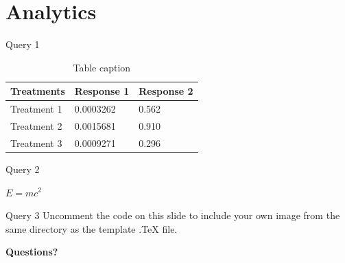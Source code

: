 \documentclass[aspectratio=169,xcolor=dvipsnames]{beamer}
\begin{document}
\section{Analytics}

\begin{frame}{Query 1}
	\begin{table}
		\begin{tabular}{l l l}
			\toprule
			\textbf{Treatments} & \textbf{Response 1} & \textbf{Response 2} \\
			\midrule
			Treatment 1         & 0.0003262           & 0.562               \\
			Treatment 2         & 0.0015681           & 0.910               \\
			Treatment 3         & 0.0009271           & 0.296               \\
			\bottomrule
		\end{tabular}
		\caption{Table caption}
	\end{table}
\end{frame}


\begin{frame}{Query 2}
	\begin{theorem}
		$E = mc^2$
	\end{theorem}
\end{frame}


\begin{frame}{Query 3}
	Uncomment the code on this slide to include your own image from the same directory as the template .TeX file.
\end{frame}


\begin{frame}
	\Huge{\centerline{\textbf{Questions?}}}
\end{frame}

\end{document}
